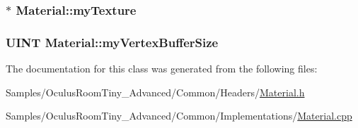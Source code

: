 \subsubsection[{\texorpdfstring{my\+Texture}{myTexture}}]{$\ast$ Material\+::my\+Texture\hspace{0.3cm}{\ttfamily [protected]}}\hypertarget{class_material_a8ff893b848c3392c63898b2951b6ec78}{}\label{class_material_a8ff893b848c3392c63898b2951b6ec78}
\subsubsection[{\texorpdfstring{my\+Vertex\+Buffer\+Size}{myVertexBufferSize}}]{\setlength{\rightskip}{0pt plus 5cm}U\+I\+NT Material\+::my\+Vertex\+Buffer\+Size\hspace{0.3cm}{\ttfamily [protected]}}\hypertarget{class_material_af0c062e2928f04c57056fe77f4f47f37}{}\label{class_material_af0c062e2928f04c57056fe77f4f47f37}


The documentation for this class was generated from the following files\+:\begin{DoxyCompactItemize}
\item 
Samples/\+Oculus\+Room\+Tiny\+\_\+\+Advanced/\+Common/\+Headers/\hyperlink{_material_8h}{Material.\+h}\item 
Samples/\+Oculus\+Room\+Tiny\+\_\+\+Advanced/\+Common/\+Implementations/\hyperlink{_material_8cpp}{Material.\+cpp}\end{DoxyCompactItemize}
